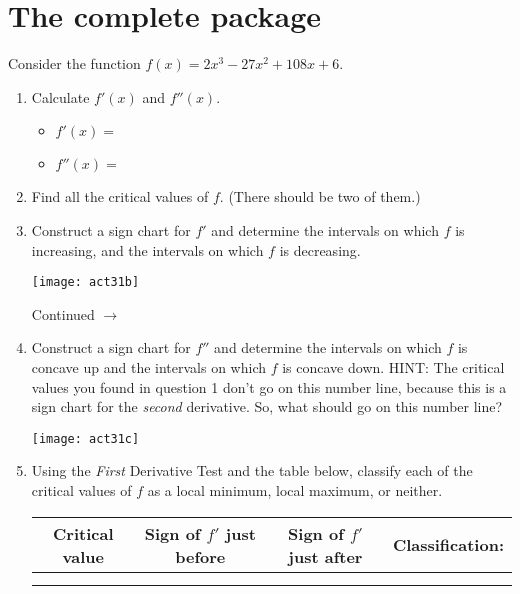 \documentclass[11pt]{article}
\def\ra{\rightarrow}
\def\pageturn{\vfill 
\begin{flushright}
	\begin{small}
		Continued $\ra$
	\end{small}
\end{flushright} \newpage}
\begin{document}
\section{The complete package}

Consider the function $f(x) = 2x^3 - 27x^2 + 108x + 6$. 

\begin{enumerate}
	\item Calculate $f'(x)$ and $f''(x)$. 
		\begin{itemize}
			\item $f'(x) = $
			\item $f''(x) = $ 
		\end{itemize}
	\item Find all the critical values of $f$. (There should be two of them.) 
	\vspace{0.4in}
	
	\item Construct a sign chart for $f'$ and determine the intervals on which $f$ is increasing, and the intervals on which $f$ is decreasing. 
	
	\bigskip
	
	\texttt{[image: act31b]}
	
	\pageturn
	
	
	\item Construct a sign chart for $f''$ and determine the intervals on which $f$ is concave up and the intervals on which $f$ is concave down. HINT: The critical values you found in question 1 don't go on this number line, because this is a sign chart for the \emph{second} derivative. So, what should go on this number line? 
	
	\bigskip
	
	\texttt{[image: act31c]}
	
	
	
	\item Using the \emph{First} Derivative Test and the table below, classify each of the critical values of $f$ as a local minimum, local maximum, or neither. 
	
\begin{center}
	\begin{tabular}{c|c|c|c}
	Critical value & Sign of $f'$ just before & Sign of $f'$ just after & Classification: \\ \hline
	\hspace{0.5in} & \hspace{0.5in} & \hspace{0.5in} & \hspace{0.5in} \\ \hline
	\hspace{0.5in} & \hspace{0.5in} & \hspace{0.5in} & \hspace{0.5in} 
	\end{tabular}
\end{center}


\end{enumerate}
\end{document}

